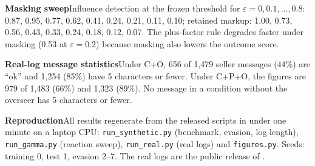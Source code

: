 \documentclass[10pt]{article}
\newcommand{\para}[1]{\textbf{#1}\hspace{0.45em}}
\begin{document}
\para{Masking sweep}Influence detection at the frozen threshold for $\varepsilon=0,0.1,\dots,0.8$: 0.87, 0.95, 0.77, 0.62, 0.41, 0.24, 0.21, 0.11, 0.10; retained markup: 1.00, 0.73, 0.56, 0.43, 0.33, 0.24, 0.18, 0.12, 0.07. The plus-factor rule degrades faster under masking (0.53 at $\varepsilon{=}0.2$) because masking also lowers the outcome score.

\para{Real-log message statistics}Under C+O, 656 of 1,479 seller messages (44\%) are ``ok'' and 1,254 (85\%) have 5 characters or fewer. Under C+P+O, the figures are 979 of 1,483 (66\%) and 1,323 (89\%). No message in a condition without the overseer has 5 characters or fewer.

{\sloppy\para{Reproduction}All results regenerate from the released scripts in under one minute on a laptop CPU: \texttt{run\_synthetic.py} (benchmark, evasion, log length), \texttt{run\_gamma.py} (reaction sweep), \texttt{run\_real.py} (real logs) and \texttt{figures.py}. Seeds: training 0, test 1, evasion 2--7. The real logs are the public release of \citet{agrawal}.\par}
\end{document}
